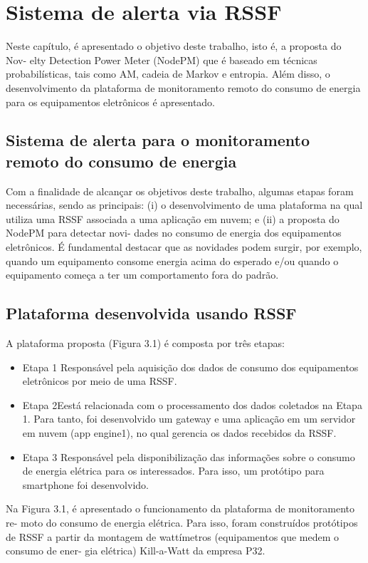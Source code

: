 \chapter{Sistema de alerta via RSSF}
Neste capítulo, é apresentado o objetivo deste trabalho, isto é, a proposta do Nov- elty Detection Power Meter (NodePM) que é baseado em técnicas probabilísticas, tais como AM, cadeia de Markov e entropia. Além disso, o desenvolvimento da plataforma de monitoramento remoto do consumo de energia para os equipamentos eletrônicos é apresentado.


\section{Sistema de alerta para o monitoramento remoto do consumo de energia}

Com a finalidade de alcançar os objetivos deste trabalho, algumas etapas foram necessárias, sendo as principais: (i) o desenvolvimento de uma plataforma na qual utiliza uma RSSF associada a uma aplicação em nuvem; e (ii) a proposta do NodePM para detectar novi- dades no consumo de energia dos equipamentos eletrônicos. É fundamental destacar que as novidades podem surgir, por exemplo, quando um equipamento consome energia acima do esperado e/ou quando o equipamento começa a ter um comportamento fora do padrão.

\section{ Plataforma desenvolvida usando RSSF}

A plataforma proposta (Figura 3.1) é composta por três etapas:

\begin{itemize}
\item{Etapa 1} Responsável pela aquisição dos dados de consumo dos equipamentos eletrônicos por meio de uma RSSF.
\item{Etapa 2}Eestá relacionada com o processamento dos dados coletados na Etapa 1. Para tanto, foi desenvolvido um gateway e uma aplicação em um servidor em nuvem (app engine1), no qual gerencia os dados recebidos da RSSF.
\item{Etapa 3} Responsável pela disponibilização das informações sobre o consumo de energia elétrica para os interessados. Para isso, um protótipo para smartphone foi desenvolvido.
\end{itemize}

Na Figura 3.1, é apresentado o funcionamento da plataforma de monitoramento re- moto do consumo de energia elétrica. Para isso, foram construídos protótipos de RSSF a partir da montagem de wattímetros (equipamentos que medem o consumo de ener- gia elétrica) Kill-a-Watt da empresa P32.

